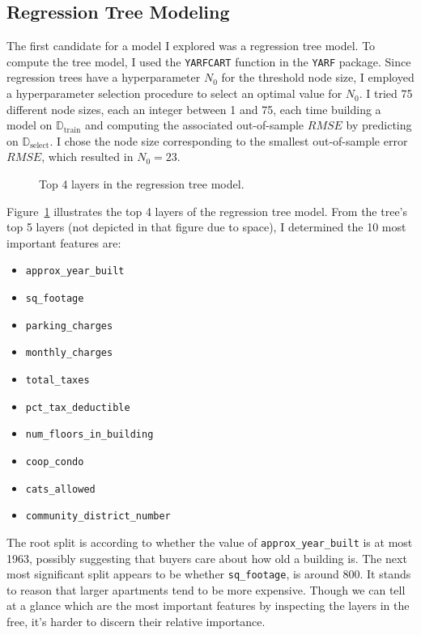 \documentclass[11pt]{article}
\begin{document}
	\subsection{Regression Tree Modeling}
	The first candidate for a model I explored was a regression tree model.
	To compute the tree model, I used the \verb|YARFCART| function in the
	\verb|YARF| package. Since regression trees have a hyperparameter $N_0$
	for the threshold node size, I employed a hyperparameter selection procedure
	to select an optimal value for $N_0$. I tried 75 different node sizes, each an
	integer between 1 and 75, each time building a model on $\mathbb{D}_{\text{train}}$
	and computing the associated out-of-sample $RMSE$ by predicting on 
	$\mathbb{D}_{\text{select}}$. I chose the node size corresponding to the
	smallest out-of-sample error $RMSE$, which resulted in $N_0 = 23$.
	\begin{figure}
		\centering
		\caption{Top 4 layers in the regression tree model.}
		\label{fig:tree-mod-top-levels}
	\end{figure}
	Figure~\ref{fig:tree-mod-top-levels} illustrates the top 4 layers of the
	regression tree model. From the tree's top 5 layers (not depicted in that figure
	due to space), I determined the 10 most important features are:
	\begin{multicols}{3}
		\begin{itemize}
			\item \verb|approx_year_built|
			\item \verb|sq_footage|
			\item \verb|parking_charges|
			\item \verb|monthly_charges|
			\item \verb|total_taxes|
			\item \verb|pct_tax_deductible|
			\item \verb|num_floors_in_building|
			\item \verb|coop_condo|
			\item \verb|cats_allowed|
			\item \verb|community_district_number|
		\end{itemize}
	\end{multicols}
	The root split is according to whether the value of \verb|approx_year_built|
	is at most 1963, possibly suggesting that buyers care about how old a
	building is. The next most significant split appears to be whether
	\verb|sq_footage|, is around 800. It stands to reason that larger
	apartments tend to be more expensive. Though we can tell at a glance which are
	the most important features by inspecting the layers in the free,
	it's harder to discern their relative importance.
\end{document}
